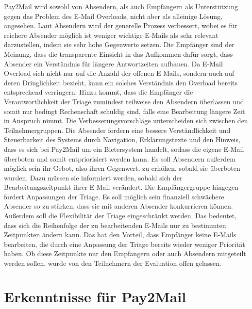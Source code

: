 Pay2Mail wird sowohl von Absendern, als auch Empfängern als Unterstützung gegen das Problem des E-Mail Overloads, nicht aber als alleinige Lösung, angesehen. Laut Absendern wird der generelle Prozess verbessert, wobei es für reichere Absender möglich ist weniger wichtige E-Mails als sehr relevant darzustellen, indem sie sehr hohe Gegenwerte setzen. Die Empfänger sind der Meinung, dass die transparente Einsicht in das Aufkommen dafür sorgt, dass Absender ein Verständnis für längere Antwortzeiten aufbauen. Da E-Mail Overload sich nicht nur auf die Anzahl der offenen E-Mails, sondern auch auf deren Dringlichkeit bezieht, kann ein solches Verständnis den Overload bereits entsprechend verringern. Hinzu kommt, dass die Empfänger die Verantwortlichkeit der Triage zumindest teilweise den Absendern überlassen und somit nur bedingt Rechenschaft schuldig sind, falls eine Bearbeitung längere Zeit in Anspruch nimmt. Die Verbesserungsvorschläge unterscheiden sich zwischen den Teilnehmergruppen. Die Absender fordern eine bessere Verständlichkeit und Steuerbarkeit des Systems durch Navigation, Erklärungstexte und den Hinweis, dass es sich bei Pay2Mail um ein Bietersystem handelt, sodass die eigene E-Mail überboten und somit entpriorisiert werden kann. Es soll Absendern außerdem möglich sein ihr Gebot, also ihren Gegenwert, zu erhöhen, sobald sie überboten wurden. Dazu müssen sie informiert werden, sobald sich der Bearbeitungszeitpunkt ihrer E-Mail verändert. Die Empfängergruppe hingegen fordert Anpassungen der Triage. Es soll möglich sein finanziell schwächere Absender so zu stärken, dass sie mit anderen Absender konkurrieren können. Außerdem soll die Flexibilität der Triage eingeschränkt werden. Das bedeutet, dass sich die Reihenfolge der zu bearbeitenden E-Mails nur zu bestimmten Zeitpunkten ändern kann. Das hat den Vorteil, dass Empfänger keine E-Mails bearbeiten, die durch eine Anpassung der Triage bereits wieder weniger Priorität haben. Ob diese Zeitpunkte nur den Empfängern oder auch Absendern mitgeteilt werden sollen, wurde von den Teilnehmern der Evaluation offen gelassen.

\section{Erkenntnisse für Pay2Mail}
\label{Erkenntnisse_für_Pay2Mail}

